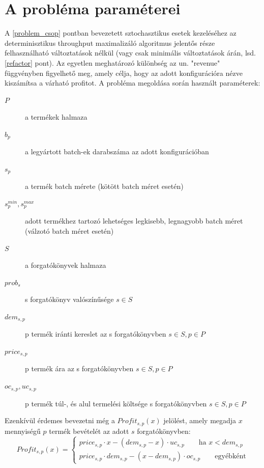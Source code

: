 \section{A probléma paraméterei} \label{problem_parameters}
A \ref{problem_csop} pontban bevezetett sztochasztikus esetek kezeléséhez az determinisztikus throughput maximalizáló algoritmus jelentős része felhasználható változtatások nélkül (vagy csak minimális változtatások árán, lsd. \ref{refactor} pont).
Az egyetlen meghatározó különbség az un. "revenue" függvényben figyelhető meg, amely célja, hogy az adott konfigurációra nézve kiszámítsa a várható profitot.
A probléma megoldása során használt paraméterek:
\begin {description}
\item[$P$]  a termékek halmaza
\item[$b_p$]  a legyártott batch-ek darabszáma az adott konfigurációban
\item[$s_p$]  a termék batch mérete (kötött batch méret esetén)
\item[$s_p^{min},s_p^{max}$]  adott termékhez tartozó lehetséges legkisebb, legnagyobb batch méret (válzotó batch méret esetén)
\item[$S$]  a forgatókönyvek halmaza
\item[$prob_s$]  s forgatókönyv valószínűsége $s	\in S$
\item[$dem_{s,p}$]  p termék iránti kereslet az s forgatókönyvben $s	\in S, p	\in P$
\item[$price_{s,p}$]  p termék ára az s forgatókönyvben $s	\in S, p	\in P$
\item[$oc_{s,p}, uc_{s,p}$]  p termék túl-, és alul termelési költsége s forgatókönyvben $s	\in S, p	\in P$
\end {description}
Ezenkívül érdemes bevezetni még a $Profit_{s,p}(x)$ jelölést, amely megadja $x$ mennyiségű $p$ termék bevételét az adott $s$ forgatókönyvben:
\begin{equation*}
Profit_{s,p}(x)= \begin{cases}
            price_{s,p}\cdot x-(dem_{s,p}-x) \cdot uc_{s,p}\qquad \text{ha } x<dem_{s,p} \\
            price_{s,p} \cdot dem_{s,p}-(x-dem_{s,p}) \cdot oc_{s,p}\qquad \text{egyébként}
       \end{cases}
\end{equation*}\\
